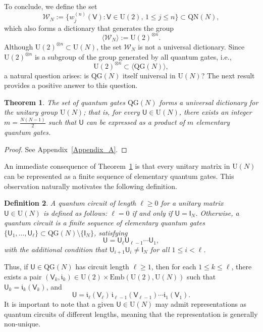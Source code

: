 \documentclass[a4paper,11pt]{article}
\newtheorem{theorem}{Theorem}[section]
\newtheorem{definition}[theorem]{Definition}
\newcommand{\rI}{\mathsf{I}}
\newcommand{\rU}{\mathsf{U}}
\newcommand{\rV}{\mathsf{V}}
\begin{document}
\bigskip

To conclude, we define the set
\[
\mathcal{W}_N := \{w_j^{(n)}(\rV) : \rV \in \mathrm{U}(2),\, 1 \leq j \leq n\} \subset \mathrm{QN}(N),
\]
which also forms a dictionary that generates the group
\[
\langle \mathcal{W}_N \rangle := \mathrm{U}(2)^{\otimes n}.
\]
Although \(\mathrm{U}(2)^{\otimes n} \subset \mathrm{U}(N)\), the set \(\mathcal{W}_N\) is not a universal dictionary. Since \(\mathrm{U}(2)^{\otimes n}\) is a subgroup of the group generated by all quantum gates, i.e.,
\[
\mathrm{U}(2)^{\otimes n} \subset \langle \mathrm{QG}(N) \rangle,
\]
a natural question arises: is \(\mathrm{QG}(N)\) itself universal in \(\mathrm{U}(N)\)? The next result provides a positive answer to this question.

\begin{theorem}\label{thm:universal_dictionary}
The set of quantum gates \(\mathrm{QG}(N)\) forms a universal dictionary for the unitary group \(\mathrm{U}(N)\); that is, for every \(\rU \in \mathrm{U}(N)\), there exists an integer \(m = \frac{N(N-1)}{2}\) such that \(\rU\) can be expressed as a product of \(m\) elementary quantum gates.
\end{theorem}

\begin{proof}
See Appendix~\ref{Appendix_A}.
\end{proof}

An immediate consequence of Theorem~\ref{thm:universal_dictionary} is that every unitary matrix in \(\mathrm{U}(N)\) can be represented as a finite sequence of elementary quantum gates. This observation naturally motivates the following definition.

\begin{definition}
A \emph{quantum circuit} of length \(\ell \geq 0\) for a unitary matrix \(\rU \in \mathrm{U}(N)\) is defined as follows:  
\(\ell = 0\) if and only if \(\rU = \rI_N\). Otherwise, a quantum circuit is a finite sequence of elementary quantum gates  
\(\{\rU_1, \ldots, \rU_\ell\} \subset \mathrm{QG}(N) \setminus \{\rI_N\}\), satisfying
\[
\rU = \rU_\ell \rU_{\ell-1} \cdots \rU_1,
\]
with the additional condition that \(\rU_{i+1} \rU_i \neq \rI_N\) for all \(1 \leq i < \ell\).
\end{definition}

\bigskip

Thus, if \(\rU \in \mathrm{QG}(N)\) has circuit length \(\ell \geq 1\), then for each \(1 \leq k \leq \ell\), there exists a pair \((\rV_k, \mathfrak{i}_k) \in \mathrm{U}(2) \times \mathrm{Emb}(\mathrm{U}(2),\mathrm{U}(N))\) such that \(\rU_k = \mathfrak{i}_k(\rV_k)\), and
\[
\rU = \mathfrak{i}_\ell(\rV_\ell) \, \mathfrak{i}_{\ell-1}(\rV_{\ell-1}) \cdots \mathfrak{i}_1(\rV_1).
\]
It is important to note that a given \(\rU \in \mathrm{U}(N)\) may admit representations as quantum circuits of different lengths, meaning that the representation is generally non-unique. 
\end{document}
